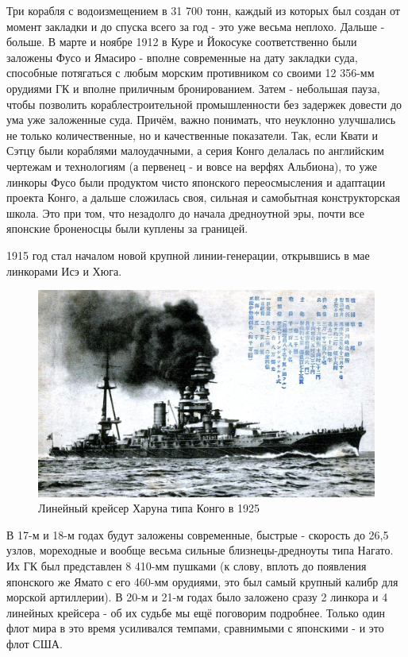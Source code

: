 Три корабля с водоизмещением в 31 700 тонн, каждый из которых был создан от момент закладки и до спуска всего за год - это уже весьма неплохо. Дальше - больше. В марте и ноябре 1912 в Куре и Йокосуке соответственно были заложены Фусо и Ямасиро - вполне современные на дату закладки суда, способные потягаться с любым морским противником со своими 12 356-мм орудиями ГК и вполне приличным бронированием. Затем - небольшая пауза, чтобы позволить кораблестроительной промышленности без задержек довести до ума уже заложенные суда. Причём, важно понимать, что неуклонно улучшались не только количественные, но и качественные показатели. Так, если Квати и Сэтцу были кораблями малоудачными, а серия Конго делалась по английским чертежам и технологиям (а первенец - и вовсе на верфях Альбиона), то уже линкоры Фусо были продуктом чисто японского переосмысления и адаптации проекта Конго, а дальше сложилась своя, сильная и самобытная конструкторская школа. Это при том, что незадолго до начала дредноутной эры, почти все японские броненосцы были куплены за границей.

1915 год стал началом новой крупной линии-генерации, открывшись в мае линкорами Исэ и Хюга. 

\begin{figure}[h!tb] 
	\centering\includegraphics[scale=0.35]{Glava4/_GZCSlPbPmg.jpg}
	\caption{Линейный крейсер Харуна типа Конго в 1925}%
\end{figure}

В 17-м и 18-м годах будут заложены современные, быстрые - скорость до 26,5 узлов, мореходные и вообще весьма сильные близнецы-дредноуты типа Нагато. Их ГК был представлен 8 410-мм пушками (к слову, вплоть до появления японского же Ямато с его 460-мм орудиями, это был самый крупный калибр для морской артиллерии). В 20-м и 21-м годах было заложено сразу 2 линкора и 4 линейных крейсера - об их судьбе мы ещё поговорим подробнее. Только один флот мира в это время усиливался темпами, сравнимыми с японскими - и это флот США.

